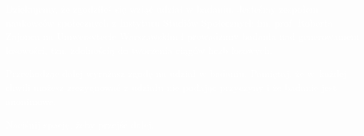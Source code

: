 \documentclass[12pt, crop,varwidth,border=3pt,convert={density=300,outext=.png}]{standalone}
\begin{document}
\textcolor{white}{Dziękujemy, że zgodziłeś się wziąć udział w badaniu. Jesteśmy zespołem naukowców społecznych z Instytutu Studiów Społecznych im. prof. Roberta Zajonca na Uniwersytecie Warszawskim i prowadzimy badania nad generowaniem losowości, tzn. zdolnością do tworzenia ciągów liczb losowych. }
\newline

\textcolor{white}{Przechodząc dalej wyrażasz zgodę na udział w badaniu. Pamiętaj, że w~każdej chwili możesz zrezygnować z udziału nie podając przyczyny i że badanie jest anonimowe.}
\newline

\begin{center}
\textcolor{white}{\Large Naciśnij spację, żeby przejść dalej.}
\end{center}
\end{document}

